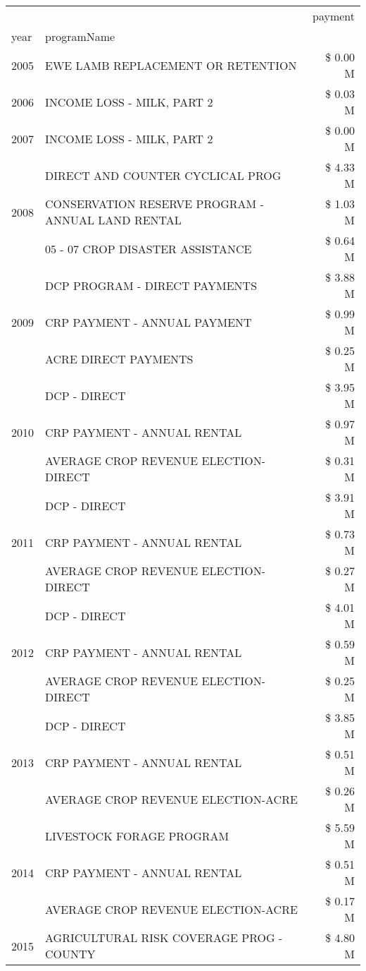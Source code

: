 \begin{tabular}{llr}
\toprule
 &  & payment \\
year & programName &  \\
\midrule
2005 & EWE LAMB REPLACEMENT OR RETENTION & \$ 0.00 M \\
\cline{1-3}
2006 & INCOME LOSS - MILK, PART 2 & \$ 0.03 M \\
\cline{1-3}
2007 & INCOME LOSS - MILK, PART 2 & \$ 0.00 M \\
\cline{1-3}
\multirow[t]{3}{*}{2008} & DIRECT AND COUNTER CYCLICAL PROG & \$ 4.33 M \\
 & CONSERVATION RESERVE PROGRAM - ANNUAL LAND RENTAL & \$ 1.03 M \\
 & 05 - 07 CROP DISASTER ASSISTANCE & \$ 0.64 M \\
\cline{1-3}
\multirow[t]{3}{*}{2009} & DCP PROGRAM - DIRECT PAYMENTS & \$ 3.88 M \\
 & CRP PAYMENT - ANNUAL PAYMENT & \$ 0.99 M \\
 & ACRE DIRECT PAYMENTS & \$ 0.25 M \\
\cline{1-3}
\multirow[t]{3}{*}{2010} & DCP - DIRECT & \$ 3.95 M \\
 & CRP PAYMENT - ANNUAL RENTAL & \$ 0.97 M \\
 & AVERAGE CROP REVENUE ELECTION-DIRECT & \$ 0.31 M \\
\cline{1-3}
\multirow[t]{3}{*}{2011} & DCP - DIRECT & \$ 3.91 M \\
 & CRP PAYMENT - ANNUAL RENTAL & \$ 0.73 M \\
 & AVERAGE CROP REVENUE ELECTION-DIRECT & \$ 0.27 M \\
\cline{1-3}
\multirow[t]{3}{*}{2012} & DCP - DIRECT & \$ 4.01 M \\
 & CRP PAYMENT - ANNUAL RENTAL & \$ 0.59 M \\
 & AVERAGE CROP REVENUE ELECTION-DIRECT & \$ 0.25 M \\
\cline{1-3}
\multirow[t]{3}{*}{2013} & DCP - DIRECT & \$ 3.85 M \\
 & CRP PAYMENT - ANNUAL RENTAL & \$ 0.51 M \\
 & AVERAGE CROP REVENUE ELECTION-ACRE & \$ 0.26 M \\
\cline{1-3}
\multirow[t]{3}{*}{2014} & LIVESTOCK FORAGE PROGRAM & \$ 5.59 M \\
 & CRP PAYMENT - ANNUAL RENTAL & \$ 0.51 M \\
 & AVERAGE CROP REVENUE ELECTION-ACRE & \$ 0.17 M \\
\cline{1-3}
\multirow[t]{3}{*}{2015} & AGRICULTURAL RISK COVERAGE PROG - COUNTY & \$ 4.80 M \\

\end{tabular}
